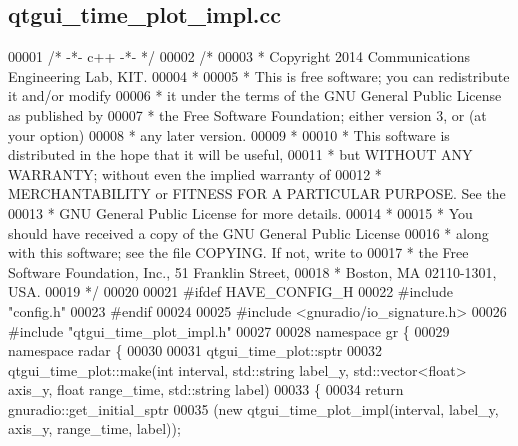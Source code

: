 \subsection{qtgui\+\_\+time\+\_\+plot\+\_\+impl.\+cc}
\label{qtgui__time__plot__impl_8cc_source}

\begin{DoxyCode}
00001 \textcolor{comment}{/* -*- c++ -*- */}
00002 \textcolor{comment}{/* }
00003 \textcolor{comment}{ * Copyright 2014 Communications Engineering Lab, KIT.}
00004 \textcolor{comment}{ * }
00005 \textcolor{comment}{ * This is free software; you can redistribute it and/or modify}
00006 \textcolor{comment}{ * it under the terms of the GNU General Public License as published by}
00007 \textcolor{comment}{ * the Free Software Foundation; either version 3, or (at your option)}
00008 \textcolor{comment}{ * any later version.}
00009 \textcolor{comment}{ * }
00010 \textcolor{comment}{ * This software is distributed in the hope that it will be useful,}
00011 \textcolor{comment}{ * but WITHOUT ANY WARRANTY; without even the implied warranty of}
00012 \textcolor{comment}{ * MERCHANTABILITY or FITNESS FOR A PARTICULAR PURPOSE.  See the}
00013 \textcolor{comment}{ * GNU General Public License for more details.}
00014 \textcolor{comment}{ * }
00015 \textcolor{comment}{ * You should have received a copy of the GNU General Public License}
00016 \textcolor{comment}{ * along with this software; see the file COPYING.  If not, write to}
00017 \textcolor{comment}{ * the Free Software Foundation, Inc., 51 Franklin Street,}
00018 \textcolor{comment}{ * Boston, MA 02110-1301, USA.}
00019 \textcolor{comment}{ */}
00020 
00021 \textcolor{preprocessor}{#ifdef HAVE\_CONFIG\_H}
00022 \textcolor{preprocessor}{#include "config.h"}
00023 \textcolor{preprocessor}{#endif}
00024 
00025 \textcolor{preprocessor}{#include <gnuradio/io\_signature.h>}
00026 \textcolor{preprocessor}{#include "qtgui_time_plot_impl.h"}
00027 
00028 \textcolor{keyword}{namespace }gr \{
00029   \textcolor{keyword}{namespace }radar \{
00030 
00031     qtgui_time_plot::sptr
00032     qtgui_time_plot::make(\textcolor{keywordtype}{int} interval, std::string label\_y, std::vector<float> axis\_y, \textcolor{keywordtype}{float} range\_time, 
      std::string label)
00033     \{
00034       \textcolor{keywordflow}{return} gnuradio::get\_initial\_sptr
00035         (\textcolor{keyword}{new} qtgui_time_plot_impl(interval, label\_y, axis\_y, range\_time, label));

\end{DoxyCode}
